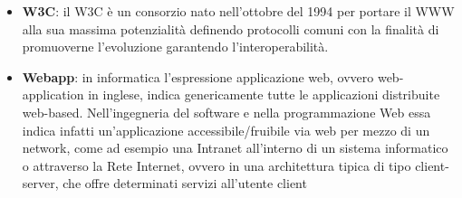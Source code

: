 \begin{itemize}
\item[] \textbf{W3C}: il W3C è un consorzio nato nell'ottobre del 1994 per portare il WWW alla sua massima potenzialità definendo protocolli comuni con la finalità di promuoverne l'evoluzione garantendo l'interoperabilità.
\item[] \textbf{Webapp}: in informatica l'espressione applicazione web, ovvero web-application in inglese, indica genericamente tutte le applicazioni distribuite web-based. Nell'ingegneria del software e nella programmazione Web essa indica infatti un'applicazione accessibile/fruibile via web per mezzo di un network, come ad esempio una Intranet all'interno di un sistema informatico o attraverso la Rete Internet, ovvero in una architettura tipica di tipo client-server, che offre determinati servizi all'utente client
\end{itemize}
